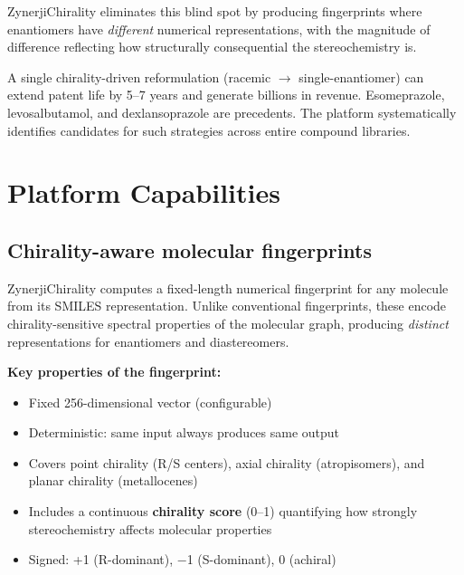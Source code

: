 \documentclass[11pt,a4paper]{article}
\begin{document}
ZynerjiChirality eliminates this blind spot by producing fingerprints where
enantiomers have \textit{different} numerical representations, with the
magnitude of difference reflecting how structurally consequential the
stereochemistry is.

\begin{financialbox}
A single chirality-driven reformulation (racemic $\to$ single-enantiomer) can
extend patent life by 5--7 years and generate billions in revenue.
Esomeprazole, levosalbutamol, and dexlansoprazole are precedents. The
platform systematically identifies candidates for such strategies across
entire compound libraries.
\end{financialbox}

\newpage

\section{Platform Capabilities}

\subsection{Chirality-aware molecular fingerprints}

ZynerjiChirality computes a fixed-length numerical fingerprint for any molecule
from its SMILES representation. Unlike conventional fingerprints, these encode
chirality-sensitive spectral properties of the molecular graph, producing
\textit{distinct} representations for enantiomers and diastereomers.

\begin{keyresult}
\textbf{Key properties of the fingerprint:}
\begin{itemize}[leftmargin=1.5em, itemsep=2pt]
  \item Fixed 256-dimensional vector (configurable)
  \item Deterministic: same input always produces same output
  \item Covers point chirality (R/S centers), axial chirality (atropisomers),
    and planar chirality (metallocenes)
  \item Includes a continuous \textbf{chirality score} (0--1) quantifying how
    strongly stereochemistry affects molecular properties
  \item Signed: +1 (R-dominant), $-$1 (S-dominant), 0 (achiral)
\end{itemize}
\end{keyresult}
\end{document}
